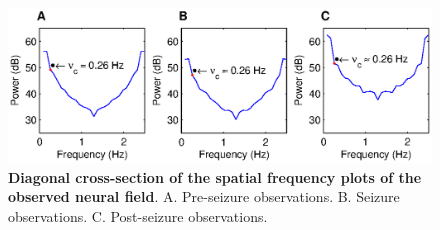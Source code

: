 \documentclass[]{article}
\begin{document}
\begin{figure}[!ht]
\begin{center}
\includegraphics{./Figures/SpatialFreqCrossSection.eps}
\end{center}
\caption{{\bf Diagonal cross-section of the spatial frequency plots of the observed neural field}. A. Pre-seizure observations. B. Seizure observations. C. Post-seizure observations.}
\label{fig:DiagSpatialFreqObservation}
\end{figure}
\end{document}

